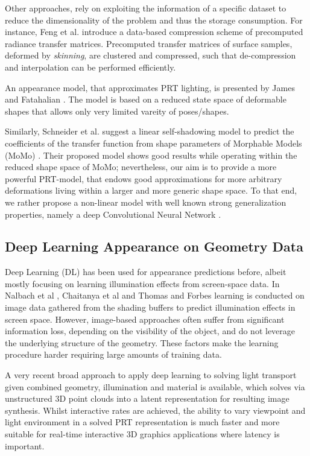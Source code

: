Other approaches, rely on exploiting the information of a specific dataset to reduce the dimensionality of the problem and thus the storage consumption. For instance, Feng et al.  introduce a data-based compression scheme of precomputed radiance transfer matrices. Precomputed transfer matrices of surface samples, deformed by \textit{skinning}, are clustered and compressed, such that de-compression and interpolation can be performed efficiently.

An appearance model, that approximates PRT lighting, is presented by James and Fatahalian  . The model is based on a reduced state space of deformable shapes that allows only very limited vareity of poses/shapes. 

Similarly, Schneider et al.  suggest a linear self-shadowing model to predict the coefficients of the transfer function from shape parameters of Morphable Models (MoMo) \cite{MoMo}. Their proposed model shows good results while operating within the reduced shape space of MoMo; nevertheless, our aim is to provide a more powerful PRT-model, that endows good approximations for more arbitrary deformations living within a larger and more generic shape space. To that end, we rather propose a non-linear model with well known strong generalization properties, namely a deep Convolutional Neural Network \cite{DL_nature, ImageNet_CNN, CNN_videoClassification}. 

\subsection*{Deep Learning Appearance on Geometry Data} 
Deep Learning (DL) has been used for appearance predictions before, albeit mostly focusing on learning illumination effects from screen-space data. In  Nalbach et al , Chaitanya et al  and Thomas and Forbes  learning is conducted on image data gathered from the shading buffers to predict illumination effects in screen space. However, image-based approaches often suffer from significant information loss, depending on the visibility of the object, and do not leverage the underlying structure of the geometry. These factors make the learning procedure harder requiring large amounts of training data.

A very recent broad approach to apply deep learning to solving light transport given combined geometry, illumination and material  \cite{Herm2018} is available, which solves via unstructured 3D point clouds into a latent representation for resulting image synthesis. Whilst interactive rates are achieved, the ability to vary viewpoint and light environment in a solved PRT representation is much faster and more suitable for real-time interactive 3D graphics applications where latency is important.


